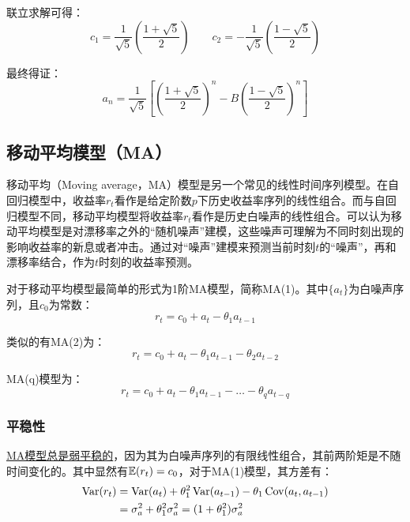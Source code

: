 \documentclass[11pt]{article}
\begin{document}
\begin{example}
    联立求解可得：
    \begin{equation*}
        c_1 = \frac{1}{\sqrt{5}} \left(\frac{1+\sqrt{5}}{2} \right) \qquad
        c_2 = - \frac{1}{\sqrt{5}} \left(\frac{1-\sqrt{5}}{2} \right)
    \end{equation*}
    
    最终得证：
    \begin{equation*}
        a_n = \frac{1}{\sqrt{5}} \left[ \left(\frac{1+\sqrt{5}}{2} \right)^n - B\left( \frac{1-\sqrt{5}}{2} \right)^n \right]
    \end{equation*}
\end{example}

\subsection{移动平均模型（MA）}

移动平均（Moving average，MA）模型是另一个常见的线性时间序列模型。在自回归模型中，收益率$r_t$看作是给定阶数$p$下历史收益率序列的线性组合。而与自回归模型不同，移动平均模型将收益率$r_t$看作是历史白噪声的线性组合。可以认为移动平均模型是对漂移率之外的“随机噪声”建模，这些噪声可理解为不同时刻出现的影响收益率的新息或者冲击。通过对“噪声”建模来预测当前时刻$t$的“噪声”，再和漂移率结合，作为$t$时刻的收益率预测。

对于移动平均模型最简单的形式为1阶MA模型，简称MA(1)。其中$\{a_t\}$为白噪声序列，且$c_0$为常数：
\begin{equation*}
    r_t = c_0 + a_{t} - \theta_1 a_{t-1}
\end{equation*}

类似的有MA(2)为：
\begin{equation*}
    r_t = c_0 + a_{t} - \theta_1 a_{t-1} - \theta_2 a_{t-2}
\end{equation*}

MA(q)模型为：
\begin{equation*}
    r_t = c_0 + a_{t} - \theta_1 a_{t-1} - \dots - \theta_q a_{t-q}
\end{equation*}

\subsubsection*{平稳性}

\uline{MA模型总是弱平稳的}，因为其为白噪声序列的有限线性组合，其前两阶矩是不随时间变化的。其中显然有$\mathbb{E}(r_t) = c_0$，对于MA(1)模型，其方差有：
\begin{align*}
    \operatorname{Var}(r_t) &= \operatorname{Var}(a_t) + \theta_1^2 \operatorname{Var}(a_{t-1}) - \theta_1 \operatorname{Cov}(a_t,a_{t-1}) \\
    & = \sigma_{a}^{2} + \theta_1^2 \sigma_{a}^{2} = (1 + \theta_1^2) \sigma_{a}^{2}
\end{align*}
\end{document}

